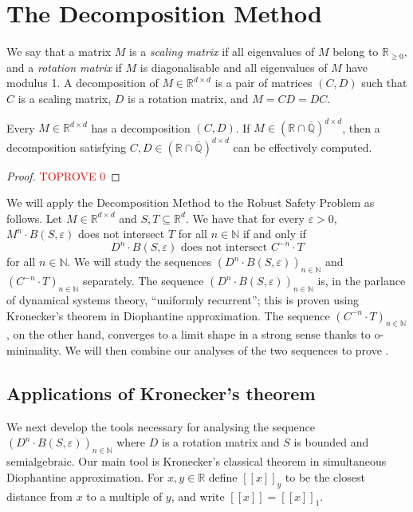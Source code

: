 \documentclass[a4paper,UKenglish,cleveref]{lipics-v2021}
\newcommand{\nat}{\mathbb{N}}
\newcommand{\rel}{\mathbb{R}}
\newcommand{\rat}{\mathbb{Q}}
\newcommand{\alg}{\overline{\rat}}
\newcommand{\ralg}{\rel \cap \alg}
\begin{document}
\section{The Decomposition Method}

We say that a matrix $M$ is a \emph{scaling matrix} if all eigenvalues of $M$ belong to $\rel_{\ge 0}$, and a \emph{rotation matrix} if $M$ is diagonalisable and all eigenvalues of $M$ have modulus 1.
A decomposition of $M\in\rel^{d\times d}$ is a pair of matrices $(C,D)$ such that $C$ is a scaling matrix, $D$ is a rotation matrix, and $M = CD = DC$.

\begin{lemma}
	Every $M \in \rel^{d\times d}$ has a decomposition $(C,D)$.
	If $M \in (\ralg)^{d\times d}$, then a decomposition satisfying $C, D \in (\ralg)^{d\times d}$ can be effectively computed.
\end{lemma}
\begin{proof}\textcolor{red}{TOPROVE 0}\end{proof}

We will apply the Decomposition Method to the Robust Safety Problem as follows.
Let $M \in \rel^{d\times d}$ and $S, T \subseteq \rel^d$.
We have that for every $\varepsilon > 0$, $M^n \cdot B(S, \varepsilon)$ does not intersect $T$ for all $n \in\nat$ if and only if
\[
D^n \cdot B(S,\varepsilon) \textrm{ does not intersect } C^{-n} \cdot T
\]
for all $n \in \nat$.
We will study the sequences $(D^n \cdot B(S,\varepsilon))_{n\in\nat}$ and $(C^{-n}\cdot T)_{n\in\nat}$ separately.
The sequence $(D^n \cdot B(S,\varepsilon))_{n\in\nat}$ is, in the parlance of dynamical systems theory, ``uniformly recurrent''; this is proven using Kronecker's theorem in Diophantine approximation.
The sequence $(C^{-n}\cdot T)_{n\in\nat}$, on the other hand, converges to a limit shape in a strong sense thanks to o-minimality.
We will then combine our analyses of the two sequences to prove .

\subsection{Applications of Kronecker's theorem}
\label{sec:kronecker}

We next develop the tools necessary for analysing the sequence $(D^n \cdot B(S, \varepsilon))_{n\in\nat}$ where $D$ is a rotation matrix and $S$ is bounded and semialgebraic.
Our main tool is Kronecker's classical theorem in simultaneous Diophantine approximation.
For $x, y \in \rel$ define $[\![ x ]\!]_y$ to be the closest distance from $x$ to a multiple of $y$, and write $[\![ x ]\!] = [\![ x ]\!]_1$.
\end{document}

